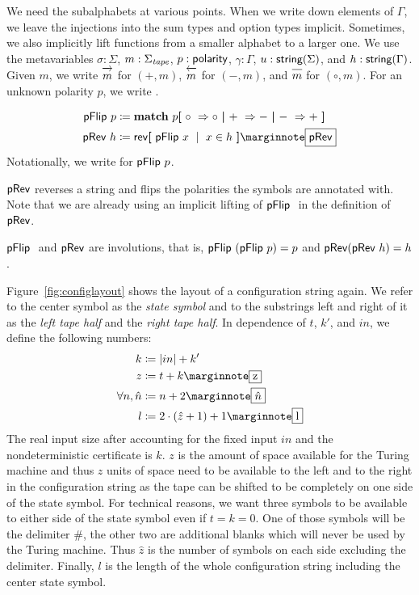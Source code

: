 We need the subalphabets at various points. When we write down elements of $\Gamma$, we leave the injections into the sum types and option types implicit. Sometimes, we also implicitly lift functions from a smaller alphabet to a larger one.
We use the metavariables $\sigma : \Sigma$, $m : \Sigma_{\mathit{tape}}$, $p : \textsf{polarity}$, $\gamma : \Gamma$, $u : \textsf{string}{(\Sigma)}$, and $h : \textsf{string}{(\Gamma)}$. 
Given $m$, we write $\polpos{m}$ for $(+, m)$, $\polneg{m}$ for $(-, m)$, and $\polneut{m}$ for $(\circ, m)$. For an unknown polarity $p$, we write .

\begin{definition}
  \begin{align*}
    \pFlip{p} &\defeq \match p \withl \circ~\Rightarrow \circ \withm +~\Rightarrow - \withm -~\Rightarrow +\withr \\
    \pRev~h &\defeq \rev{\withl\pFlip{x} \bnfmid x \in h\withr}
    \mnote{\pRev}
  \end{align*}
  Notationally, we write  for $\textsf{pFlip}~p$. 
\end{definition}
$\textsf{pRev}$ reverses a string and flips the polarities the symbols are annotated with.
Note that we are already using an implicit lifting of $\textsf{pFlip}~$ in the definition of $\textsf{pRev}$. 

\begin{fact}[Involutions]\label{fact:prev_involution}
  $\textsf{pFlip}~$ and $\textsf{pRev}{}$ are involutions, that is, $\textsf{pFlip}~(\textsf{pFlip}~p) = p$ and $\textsf{pRev}{(\textsf{pRev}~h)} = h$. 
\end{fact}

Figure~\ref{fig:configlayout} shows the layout of a configuration string again. We refer to the center symbol as the \emph{state symbol} and to the substrings left and right of it as the \emph{left tape half} and the \emph{right tape half}.
In dependence of $t$, $k'$, and $in$, we define the following numbers:
\begin{align*}
  k &\defeq \length{in} + k' \\
  z &\defeq t + k \mnote{z}\\
  \forall n, \hat{n} &\defeq n + 2 \mnote{$\hat{n}$}\\
  l &\defeq 2 \cdot (\hat{z} + 1) + 1 \mnote{l}
\end{align*}
The real input size after accounting for the fixed input $in$ and the nondeterministic certificate is $k$.
$z$ is the amount of space available for the Turing machine and thus $z$ units of space need to be available to the left and to the right in the configuration string as the tape can be shifted to be completely on one side of the state symbol.
For technical reasons, we want three symbols to be available to either side of the state symbol even if $t = k = 0$. One of those symbols will be the delimiter $\#$, the other two are additional blanks which will never be used by the Turing machine. Thus $\hat{z}$ is the number of symbols on each side excluding the delimiter. 
Finally, $l$ is the length of the whole configuration string including the center state symbol.

